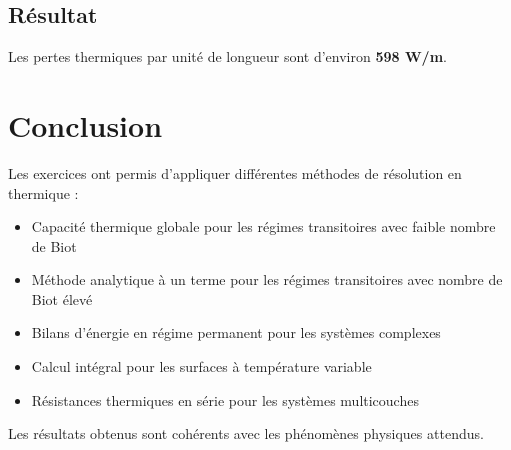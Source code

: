 \documentclass{rapportECL}
\begin{document}
\subsection*{Résultat}
Les pertes thermiques par unité de longueur sont d'environ \textbf{598 W/m}.

\section*{Conclusion}
Les exercices ont permis d'appliquer différentes méthodes de résolution en thermique : 
\begin{itemize}
    \item Capacité thermique globale pour les régimes transitoires avec faible nombre de Biot
    \item Méthode analytique à un terme pour les régimes transitoires avec nombre de Biot élevé
    \item Bilans d'énergie en régime permanent pour les systèmes complexes
    \item Calcul intégral pour les surfaces à température variable
    \item Résistances thermiques en série pour les systèmes multicouches
\end{itemize}

Les résultats obtenus sont cohérents avec les phénomènes physiques attendus.
\end{document}

